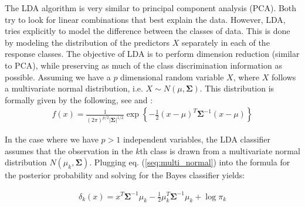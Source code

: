 \documentclass[../thesis.tex]{subfiles}
\begin{document}
\noindent The LDA algorithm is very similar to principal component analysis (PCA). Both try to look for linear combinations that best explain the data. However, LDA, tries explicitly to model the difference between the classes of data. This is done by modeling the distribution of the predictors $X$ separately in each of the response classes. The objective of LDA is to perform dimension reduction (similar to PCA), while preserving as much of the class discrimination information as possible. Assuming we have a $p$ dimensional random variable $X$, where $X$ follows a multivariate normal distribution, i.e. $X \sim N(\mu,\boldsymbol{\Sigma})$. This distribution is formally given by the following, see \cite{friedman2009elements} and \cite{james2013introduction}:
\begin{align}
    f(x) = \frac{1}{(2\pi)^{p / 2}|\boldsymbol{\Sigma}|^{1/2}} \exp\left \{-\frac{1}{2}(x-\mu)^T \boldsymbol{\Sigma}^{-1} (x - \mu) \right \}
    \label{seq:multi_normal}
\end{align}

\noindent In the case where we have $p > 1$ independent variables, the LDA classifier assumes that the observation in the $k$th class is drawn from a multivariate normal distribution $N(\mu_k, \boldsymbol{\Sigma})$. Plugging eq. (\ref{seq:multi_normal}) into the formula for the posterior probability and solving for the Bayes classifier yields:

\begin{align}
    \delta_k (x) = x^T\boldsymbol{\Sigma}^{-1} \mu_k - \frac{1}{2}\mu_k^T\boldsymbol{\Sigma}^{-1} \mu_k + \log \pi_k
    \label{eq:bayes_classifier}
\end{align}
\end{document}

